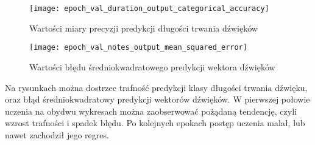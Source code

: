 {{        \begin{figure}[H]
            \centering
            \texttt{[image: epoch\_val\_duration\_output\_categorical\_accuracy]}
            \caption{Wartości miary precyzji predykcji długości trwania dźwięków}
            \label{epoch_val_duration_output_categorical_accuracy}
        \end{figure}

        \begin{figure}[H]
            \centering
            \texttt{[image: epoch\_val\_notes\_output\_mean\_squared\_error]}
            \caption{Wartości błędu średniokwadratowego predykcji wektora dźwięków}
            \label{epoch_val_notes_output_mean_squared_error}
        \end{figure}

        Na rysunkach można dostrzec trafność predykcji klasy długości trwania dźwięku, oraz błąd średniokwadratowy
        predykcji wektorów dźwięków. W\,\,pierwszej połowie uczenia na obydwu wykresach można zaobserwować pożądaną tendencję,
        czyli wzrost trafności i\,\,spadek błędu. Po kolejnych epokach postęp uczenia malał, lub nawet zachodził jego regres.
    }
}